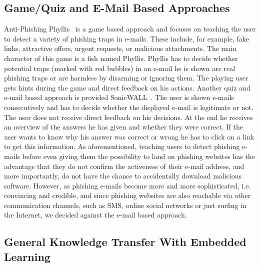 \subsection{Game/Quiz and E-Mail Based Approaches}
Anti-Phishing Phyllis~\cite{antiphishingphyllis} is a game based approach and focuses on teaching the user to detect a variety of phishing traps in e-mails. 
These include, for example, fake links, attractive offers, urgent requests, or malicious attachments. 
The main character of this game is a fish named Phyllis. 
Phyllis has to decide whether potential traps (marked with red bubbles) in an e-mail he is shown are real phishing traps or are harmless by disarming or ignoring them. 
The playing user gets hints during the game and direct feedback on his actions. 
Another quiz and e-mail based approach is provided SonicWALL~\cite{sonicwall}. 
The user is shown e-mails consecutively and has to decide whether the displayed e-mail is legitimate or not. 
The user does not receive direct feedback on his decisions. 
At the end he receives an overview of the answers he has given and whether they were correct. 
If the user wants to know why his answer was correct or wrong he has to click on a link to get this information. 
As aforementioned, teaching users to detect phishing e-mails before even giving them the possibility to land on phishing websites has the advantage that they do not confirm the activeness of their e-mail address, and more importantly, do not have the chance to accidentally download malicious software. 
However, as phishing e-mails become more and more sophisticated, i.e. convincing and credible, and since phishing websites are also reachable via other communication channels, such as SMS, online social networks or just surfing in the Internet, we decided against the e-mail based approach. 

\subsection{General Knowledge Transfer With Embedded Learning}

